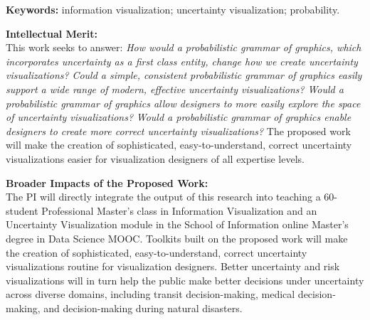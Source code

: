 \documentclass[11pt]{article}
\begin{document}
\noindent \textbf{Keywords:} information visualization; uncertainty visualization; probability.

\noindent \textbf{Intellectual Merit:}\\
This work seeks to answer: \emph{How would a probabilistic grammar of graphics, which incorporates uncertainty as a first class entity, change how we create uncertainty visualizations?} \emph{Could a simple, consistent probabilistic grammar of graphics easily support a wide range of modern, effective uncertainty visualizations?} \emph{Would a probabilistic grammar of graphics allow designers to more easily explore the space of uncertainty visualizations?} \emph{Would a probabilistic grammar of graphics enable designers to create more correct uncertainty visualizations?} The proposed work will make the creation of sophisticated, easy-to-understand, correct uncertainty visualizations easier for visualization designers of all expertise levels.

\noindent \textbf{Broader Impacts of the Proposed Work:}\\
The PI will directly integrate the output of this research into teaching a 60-student Professional Master's class in Information Visualization and an Uncertainty Visualization module in the School of Information online Master's degree in Data Science MOOC. Toolkits built on the proposed work will make the creation of sophisticated, easy-to-understand, correct uncertainty visualizations routine for visualization designers. Better uncertainty and risk visualizations will in turn help the public make better decisions under uncertainty across diverse domains, including transit decision-making, medical decision-making, and decision-making during natural disasters.
\end{document}

